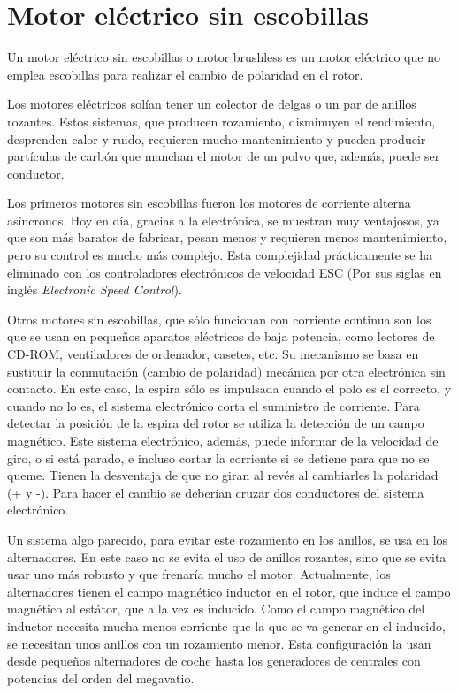 \documentclass[../main]{subfiles}
\begin{document}
\chapter{Motor eléctrico sin escobillas}
Un motor eléctrico sin escobillas o motor brushless es un motor eléctrico que no emplea escobillas para realizar el cambio de polaridad en el rotor.

Los motores eléctricos solían tener un colector de delgas o un par de anillos rozantes. Estos sistemas, que producen rozamiento, disminuyen el rendimiento, desprenden calor y ruido, requieren mucho mantenimiento y pueden producir partículas de carbón que manchan el motor de un polvo que, además, puede ser conductor.


Los primeros motores sin escobillas fueron los motores de corriente alterna asíncronos. Hoy en día, gracias a la electrónica, se muestran muy ventajosos, ya que son más baratos de fabricar, pesan menos y requieren menos mantenimiento, pero su control es mucho más complejo. Esta complejidad prácticamente se ha eliminado con los controladores electrónicos de velocidad ESC (Por sus siglas en inglés \emph{Electronic Speed Control}).

Otros motores sin escobillas, que sólo funcionan con corriente continua son los que se usan en pequeños aparatos eléctricos de baja potencia, como lectores de CD-ROM, ventiladores de ordenador, casetes, etc. Su mecanismo se basa en sustituir la conmutación (cambio de polaridad) mecánica por otra electrónica sin contacto. En este caso, la espira sólo es impulsada cuando el polo es el correcto, y cuando no lo es, el sistema electrónico corta el suministro de corriente. Para detectar la posición de la espira del rotor se utiliza la detección de un campo magnético. Este sistema electrónico, además, puede informar de la velocidad de giro, o si está parado, e incluso cortar la corriente si se detiene para que no se queme. Tienen la desventaja de que no giran al revés al cambiarles la polaridad (+ y -). Para hacer el cambio se deberían cruzar dos conductores del sistema electrónico.

Un sistema algo parecido, para evitar este rozamiento en los anillos, se usa en los alternadores. En este caso no se evita el uso de anillos rozantes, sino que se evita usar uno más robusto y que frenaría mucho el motor. Actualmente, los alternadores tienen el campo magnético inductor en el rotor, que induce el campo magnético al estátor, que a la vez es inducido. Como el campo magnético del inductor necesita mucha menos corriente que la que se va generar en el inducido, se necesitan unos anillos con un rozamiento menor. Esta configuración la usan desde pequeños alternadores de coche hasta los generadores de centrales con potencias del orden del megavatio.
\end{document}
